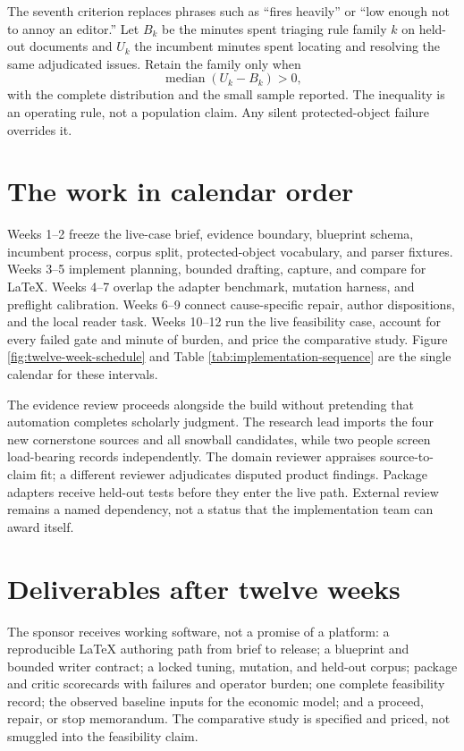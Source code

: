 The seventh criterion replaces phrases such as ``fires heavily'' or ``low enough
not to annoy an editor.'' Let $B_k$ be the minutes spent triaging rule family
$k$ on held-out documents and $U_k$ the incumbent minutes spent locating and
resolving the same adjudicated issues. Retain the family only when
\begin{equation}
  \operatorname{median}(U_k-B_k)>0,
  \label{eq:diagnostic-burden-rule}
\end{equation}
with the complete distribution and the small sample reported. The inequality is
an operating rule, not a population claim. Any silent protected-object failure
overrides it.

\section{The work in calendar order}

Weeks 1--2 freeze the live-case brief, evidence boundary, blueprint schema,
incumbent process, corpus split, protected-object vocabulary, and parser
fixtures. Weeks 3--5 implement planning, bounded drafting, capture, and compare
for LaTeX. Weeks 4--7 overlap the adapter benchmark, mutation harness, and
preflight calibration. Weeks 6--9 connect cause-specific repair, author
dispositions, and the local reader task. Weeks 10--12 run the live feasibility
case, account for every failed gate and minute of burden, and price the
comparative study. Figure
\ref{fig:twelve-week-schedule} and Table
\ref{tab:implementation-sequence} are the single calendar for these intervals.

The evidence review proceeds alongside the build without pretending that
automation completes scholarly judgment. The research lead imports the four
new cornerstone sources and all snowball candidates, while two people screen
load-bearing records independently. The domain reviewer appraises source-to-
claim fit; a different reviewer adjudicates disputed product findings. Package
adapters receive held-out tests before they enter the live path. External
review remains a named dependency, not a status that the implementation team
can award itself.

\section{Deliverables after twelve weeks}

The sponsor receives working software, not a promise of a platform: a
reproducible LaTeX authoring path from brief to release; a blueprint and bounded
writer contract; a locked tuning, mutation, and held-out corpus; package and
critic scorecards with failures and operator burden; one complete feasibility
record; the observed baseline inputs for the economic model; and a proceed,
repair, or stop memorandum. The comparative study is specified and priced, not
smuggled into the feasibility claim.

